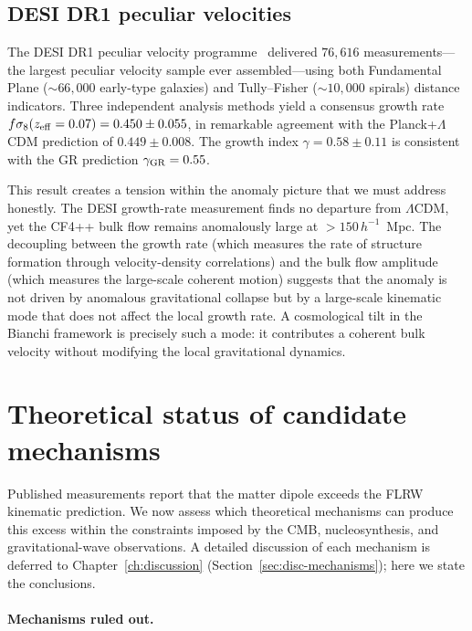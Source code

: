 \subsection{DESI DR1 peculiar velocities}
\label{sec:desi-pv}

The DESI DR1 peculiar velocity programme~\cite{DESIDR1PV2025}
delivered $76{,}616$ measurements---the largest peculiar
velocity sample ever assembled---using both Fundamental Plane
($\sim\!66{,}000$ early-type galaxies) and Tully--Fisher
($\sim\!10{,}000$ spirals) distance indicators.  Three
independent analysis methods yield a consensus growth rate
$f\sigma_8(z_{\rm eff} = 0.07) = 0.450 \pm 0.055$, in
remarkable agreement with the Planck+$\Lambda$CDM prediction
of $0.449 \pm 0.008$.  The growth index
$\gamma = 0.58 \pm 0.11$ is consistent with the GR prediction
$\gamma_{\rm GR} = 0.55$.

This result creates a tension within the anomaly picture that
we must address honestly.  The DESI growth-rate measurement
finds no departure from $\Lambda$CDM, yet the CF4++ bulk flow
remains anomalously large at $> 150\,h^{-1}$~Mpc.  The
decoupling between the growth rate (which measures the rate of
structure formation through velocity-density correlations) and
the bulk flow amplitude (which measures the large-scale
coherent motion) suggests that the anomaly is not driven by
anomalous gravitational collapse but by a large-scale
kinematic mode that does not affect the local growth rate.
A cosmological tilt in the Bianchi framework is precisely such
a mode: it contributes a coherent bulk velocity without
modifying the local gravitational dynamics.


\section{Theoretical status of candidate mechanisms}
\label{sec:dipole-theory}

Published measurements report that the matter dipole exceeds
the FLRW kinematic prediction.  We now
assess which theoretical mechanisms can produce this excess
within the constraints imposed by the CMB, nucleosynthesis,
and gravitational-wave observations.  A detailed discussion
of each mechanism is deferred to
Chapter~\ref{ch:discussion}
(Section~\ref{sec:disc-mechanisms}); here we state the
conclusions.


\paragraph{Mechanisms ruled out.}

